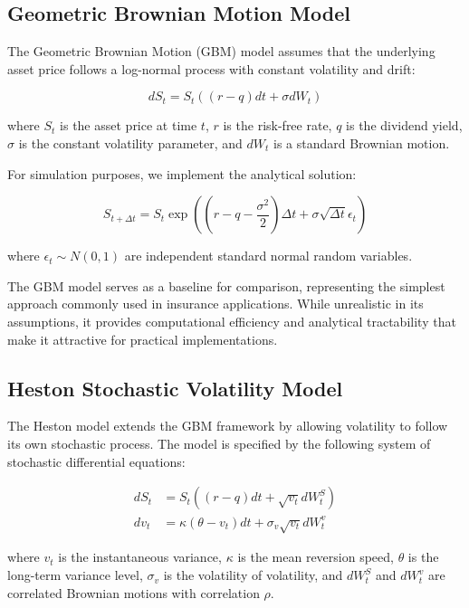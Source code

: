 \documentclass[12pt,a4paper]{report}
\begin{document}
\subsection{Geometric Brownian Motion Model}

The Geometric Brownian Motion (GBM) model assumes that the underlying asset price follows a log-normal process with constant volatility and drift:

\begin{equation}
dS_t = S_t((r-q)dt + \sigma dW_t)
\end{equation}

where $S_t$ is the asset price at time $t$, $r$ is the risk-free rate, $q$ is the dividend yield, $\sigma$ is the constant volatility parameter, and $dW_t$ is a standard Brownian motion.

For simulation purposes, we implement the analytical solution:

\begin{equation}
S_{t+\Delta t} = S_t \exp\left((r-q-\frac{\sigma^2}{2})\Delta t + \sigma\sqrt{\Delta t}\epsilon_t\right)
\end{equation}

where $\epsilon_t \sim N(0,1)$ are independent standard normal random variables.

The GBM model serves as a baseline for comparison, representing the simplest approach commonly used in insurance applications. While unrealistic in its assumptions, it provides computational efficiency and analytical tractability that make it attractive for practical implementations.

\subsection{Heston Stochastic Volatility Model}

The Heston model extends the GBM framework by allowing volatility to follow its own stochastic process. The model is specified by the following system of stochastic differential equations:

\begin{align}
dS_t &= S_t((r-q)dt + \sqrt{v_t}dW_t^S) \\
dv_t &= \kappa(\theta - v_t)dt + \sigma_v\sqrt{v_t}dW_t^v
\end{align}

where $v_t$ is the instantaneous variance, $\kappa$ is the mean reversion speed, $\theta$ is the long-term variance level, $\sigma_v$ is the volatility of volatility, and $dW_t^S$ and $dW_t^v$ are correlated Brownian motions with correlation $\rho$.
\end{document}
